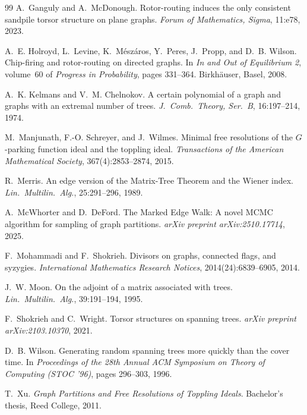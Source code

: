 \documentclass[11pt]{article}
\begin{document}
\begin{thebibliography}{99}
A.~Ganguly and A.~McDonough.
\newblock Rotor-routing induces the only consistent sandpile torsor structure
  on plane graphs.
\newblock \emph{Forum of Mathematics, Sigma}, 11:e78, 2023.

A.~E. Holroyd, L.~Levine, K.~M\'esz\'aros, Y.~Peres, J.~Propp, and D.~B.
  Wilson.
\newblock Chip-firing and rotor-routing on directed graphs.
\newblock In \emph{In and Out of Equilibrium 2}, volume~60 of \emph{Progress in
  Probability}, pages 331--364. Birkh\"auser, Basel, 2008.

A.~K. Kelmans and V.~M. Chelnokov.
\newblock A certain polynomial of a graph and graphs with an extremal number of
  trees.
\newblock \emph{J.\ Comb.\ Theory, Ser.\ B}, 16:197--214, 1974.

M.~Manjunath, F.-O. Schreyer, and J.~Wilmes.
\newblock Minimal free resolutions of the {$G$}-parking function ideal and the
  toppling ideal.
\newblock \emph{Transactions of the American Mathematical Society},
  367(4):2853--2874, 2015.

R.~Merris.
\newblock An edge version of the {M}atrix-{T}ree {T}heorem and the {W}iener
  index.
\newblock \emph{Lin.\ Multilin.\ Alg.}, 25:291--296, 1989.

A.~McWhorter and D.~DeFord.
\newblock The {M}arked {E}dge {W}alk: A novel {MCMC} algorithm for sampling of
  graph partitions.
\newblock \emph{arXiv preprint arXiv:2510.17714}, 2025.

F.~Mohammadi and F.~Shokrieh.
\newblock Divisors on graphs, connected flags, and syzygies.
\newblock \emph{International Mathematics Research Notices},
  2014(24):6839--6905, 2014.

J.~W. Moon.
\newblock On the adjoint of a matrix associated with trees.
\newblock \emph{Lin.\ Multilin.\ Alg.}, 39:191--194, 1995.

F.~Shokrieh and C.~Wright.
\newblock Torsor structures on spanning trees.
\newblock \emph{arXiv preprint arXiv:2103.10370}, 2021.

D.~B. Wilson.
\newblock Generating random spanning trees more quickly than the cover time.
\newblock In \emph{Proceedings of the 28th Annual ACM Symposium on Theory of
  Computing (STOC '96)}, pages 296--303, 1996.

T.~Xu.
\newblock \emph{Graph Partitions and Free Resolutions of Toppling Ideals}.
\newblock Bachelor's thesis, Reed College, 2011.

\end{thebibliography}
\end{document}
